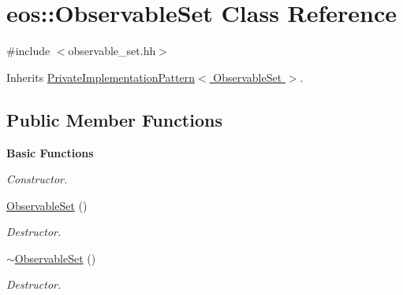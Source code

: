 \hypertarget{classeos_1_1ObservableSet}{
\section{eos::ObservableSet Class Reference}
\label{classeos_1_1ObservableSet}
}


{\ttfamily \#include $<$observable\_\-set.hh$>$}

Inherits \hyperlink{classeos_1_1PrivateImplementationPattern}{PrivateImplementationPattern$<$ ObservableSet $>$}.\subsection*{Public Member Functions}
\begin{Indent}{\bf Basic Functions}\par
{\em \label{_amgrp2386c9a1f1785edee33f374dd2db9b3d}
 Constructor. }\begin{DoxyCompactItemize}
\item 
\hyperlink{classeos_1_1ObservableSet_a964ddde72c32ae5a5e7147fb8b171318}{ObservableSet} ()
\begin{DoxyCompactList}\small\item\em Destructor. \item\end{DoxyCompactList}\item 
\hyperlink{classeos_1_1ObservableSet_a0321b23307b4b46974634dcd4d73b785}{$\sim$ObservableSet} ()
\begin{DoxyCompactList}\small\item\em Destructor. \item\end{DoxyCompactList}\end{DoxyCompactItemize}
\end{Indent}
